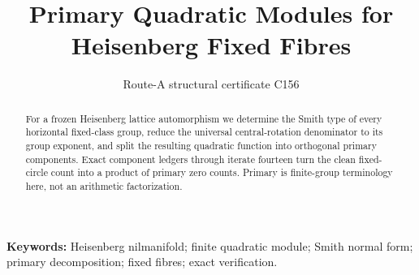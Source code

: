 \documentclass[10pt]{article}
\title{\vspace{-1.6em}Primary Quadratic Modules for Heisenberg Fixed Fibres}
\author{Route-A structural certificate C156}
\date{}
\begin{document}
\maketitle
\begin{abstract}
For a frozen Heisenberg lattice automorphism we determine the Smith type of
every horizontal fixed-class group, reduce the universal central-rotation
denominator to its group exponent, and split the resulting quadratic function
into orthogonal primary components.  Exact component ledgers through iterate
fourteen turn the clean fixed-circle count into a product of primary zero
counts.  Primary is finite-group terminology here, not an arithmetic
factorization.
\end{abstract}
\noindent\textbf{Keywords:} Heisenberg nilmanifold; finite quadratic module;
Smith normal form; primary decomposition; fixed fibres; exact verification.

\medskip
{}
\end{document}
